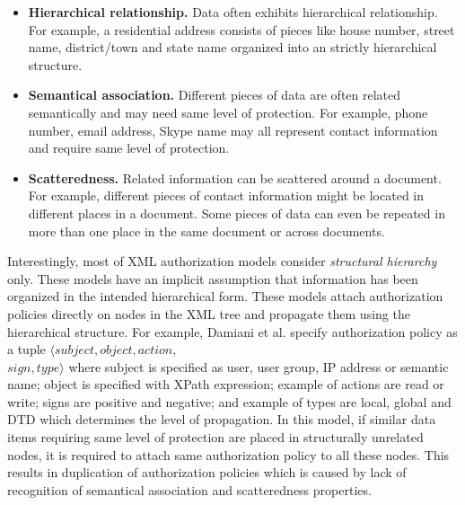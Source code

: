 \begin{itemize}
	
	\item \textbf{Hierarchical relationship.} Data often exhibits hierarchical relationship. For example, a residential address consists of pieces like house number, street name, district/town and state name organized into an strictly hierarchical structure. 
	
	
	\item \textbf{Semantical association.} Different pieces of data are often related semantically and may need same level of protection.  For example, phone number, email address, Skype name may all represent contact information and require same level of protection.
	
	\item \textbf{Scatteredness.} Related information can be scattered around a document. For example, different pieces of contact information might be located in different places in a document. Some pieces of data can even be repeated in more than one place in the same document or across documents.  
	
\end{itemize}




Interestingly, most of XML authorization models \cite{policy-based4,policy-based2,policy-based5,policy-based6} consider \textit{structural hierarchy} only. These models have an implicit assumption that information has been organized in the intended hierarchical form. These models attach authorization policies directly on nodes in the XML tree  and propagate them using the hierarchical structure. For example, Damiani et al. \cite{damiani2002fine} specify authorization policy as a tuple $\langle subject, object, action,$ \\ $sign, type \rangle$ where subject is specified as user, user group, IP address or semantic name;  object is specified with XPath expression; example of actions are read or  write; signs are positive and negative; and example of types are local, global and DTD which determines the level of propagation.  In this model, if similar data items requiring same level of protection are placed in structurally unrelated nodes, it is required to attach same authorization policy to all these nodes. This results in duplication of authorization policies which is caused by lack of recognition of semantical association and scatteredness properties. 

